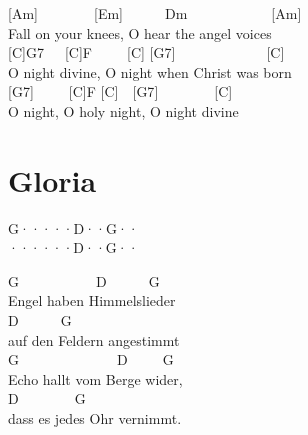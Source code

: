 \documentclass[
  letterpaper,
  twoside=false]{scrbook}
\begin{document}
{[}Am{]}~~~~~~~~{[}Em{]}~~~~~~Dm~~~~~~~~~~~~{[}Am{]}\\
Fall on your knees, O hear the angel voices\\
{[}C{]}G7~~~{[}C{]}F~~~~~{[}C{]} {[}G7{]}~~~~~~~~~~~~~{[}C{]}\\
O night divine, O night when Christ was born\\
{[}G7{]}~~~~~{[}C{]}F {[}C{]}~~{[}G7{]}~~~~~~~~{[}C{]}\\
O night, O holy night, O night divine

\hypertarget{gloria}{%
\chapter{Gloria}\label{gloria}}

\textbar G·····\textbar D··G··\textbar{}\\
\textbar······\textbar D··G··\textbar{}

G~~~~~~~~~~~D~~~~~~G\\
Engel haben Himmelslieder\\
\hspace*{0.333em}\hspace*{0.333em}\hspace*{0.333em}\hspace*{0.333em}\hspace*{0.333em}\hspace*{0.333em}\hspace*{0.333em}\hspace*{0.333em}\hspace*{0.333em}\hspace*{0.333em}\hspace*{0.333em}\hspace*{0.333em}\hspace*{0.333em}\hspace*{0.333em}\hspace*{0.333em}\hspace*{0.333em}D~~~~~~G\\
auf den Feldern angestimmt\\
G~~~~~~~~~~~~~~D~~~~~G\\
Echo hallt vom Berge wider,\\
\hspace*{0.333em}\hspace*{0.333em}\hspace*{0.333em}\hspace*{0.333em}\hspace*{0.333em}\hspace*{0.333em}\hspace*{0.333em}\hspace*{0.333em}\hspace*{0.333em}\hspace*{0.333em}\hspace*{0.333em}\hspace*{0.333em}\hspace*{0.333em}\hspace*{0.333em}D~~~~~~~~G\\
dass es jedes Ohr vernimmt.
\end{document}

